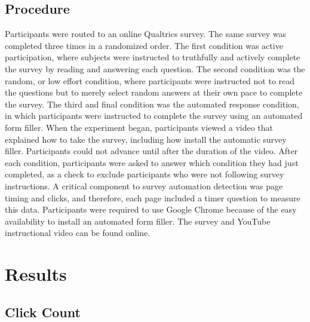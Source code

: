 \documentclass[english,man]{apa6}
\theoremstyle{definition}
\theoremstyle{definition}
\theoremstyle{definition}
\theoremstyle{remark}
\begin{document}
\subsection{Procedure}\label{procedure}

Participants were routed to an online Qualtrics survey. The same survey
was completed three times in a randomized order. The first condition was
active participation, where subjects were instructed to truthfully and
actively complete the survey by reading and answering each question. The
second condition was the random, or low effort condition, where
participants were instructed not to read the questions but to merely
select random answers at their own pace to complete the survey. The
third and final condition was the automated response condition, in which
participants were instructed to complete the survey using an automated
form filler. When the experiment began, participants viewed a video that
explained how to take the survey, including how install the automatic
survey filler. Participants could not advance until after the duration
of the video. After each condition, participants were asked to answer
which condition they had just completed, as a check to exclude
participants who were not following survey instructions. A critical
component to survey automation detection was page timing and clicks, and
therefore, each page included a timer question to measure this data.
Participants were required to use Google Chrome because of the easy
availability to install an automated form filler. The survey and YouTube
instructional video can be found online.

\section{Results}\label{results-1}

\subsection{Click Count}\label{click-count-1}
\end{document}
